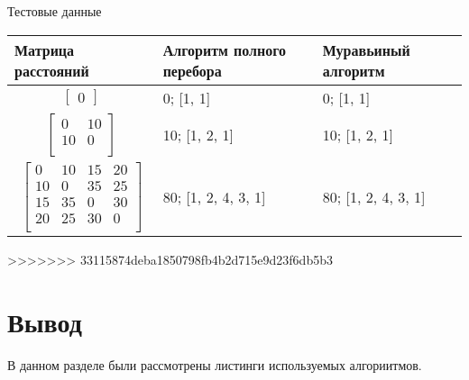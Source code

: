 \begin{center}
\begin{threeparttable}
	\caption{Тестовые данные}
	\label{tabular:testsdata}
	\begin{tabular}{|p{6cm}|p{5cm}|p{4cm}|}
		\hline
		\textbf{Матрица расстояний} & \textbf{Алгоритм полного перебора} & \textbf{Муравьиный алгоритм}
		\tabularnewline
		\hline
		\begin{equation*}
			\begin{bmatrix}
				0
			\end{bmatrix}
		\end{equation*} & 0; [1, 1] & 0; [1, 1]
		\tabularnewline
		\hline
		\begin{equation*}
			\begin{bmatrix}
				0 & 10 \\
				10 & 0 \\
			\end{bmatrix}
		\end{equation*} & 10; [1, 2, 1] & 10; [1, 2, 1]
		\tabularnewline
		\hline
		\begin{equation*}
			\begin{bmatrix}
				0 & 10 & 15 & 20 \\
				10 & 0 & 35 & 25 \\
				15 & 35 & 0 & 30 \\
				20 & 25 & 30 & 0 \\
			\end{bmatrix}
		\end{equation*} & 80; [1, 2, 4, 3, 1] & 80; [1, 2, 4, 3, 1]
		\tabularnewline
		\hline
	\end{tabular}
\end{threeparttable}
\end{center}
>>>>>>> 33115874deba1850798fb4b2d715e9d23f6db5b3

\section*{\hsp Вывод}
В данном разделе были рассмотрены листинги используемых алгориитмов.
